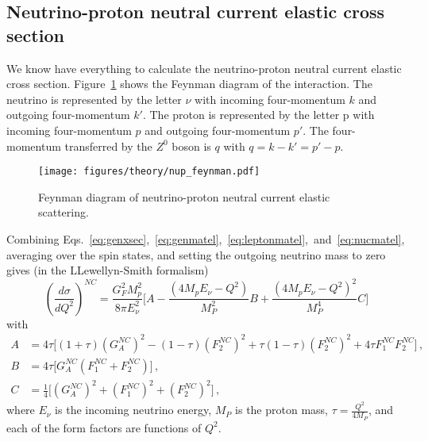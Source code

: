\subsection{Neutrino-proton neutral current elastic cross section}\label{sec:probe}

  We know have everything to calculate the neutrino-proton neutral current
  elastic cross section. Figure~\ref{fig:feynmannup} shows the Feynman diagram
  of the interaction. The neutrino is represented by the letter $\nu$ with
  incoming four-momentum $k$ and outgoing four-momentum $k'$. The proton is
  represented by the letter p with incoming four-momentum $p$ and outgoing
  four-momentum $p'$. The four-momentum transferred by the $Z^0$ boson is $q$
  with $q = k-k' = p' - p$.
  \begin{figure}[ht]
    \centering
    \texttt{[image: figures/theory/nup\_feynman.pdf]}
    \caption{Feynman diagram of neutrino-proton neutral current elastic
    scattering.}
    \label{fig:feynmannup}
  \end{figure}

  Combining
  Eqs.~\ref{eq:genxsec},~\ref{eq:genmatel},~\ref{eq:leptonmatel},~and~\ref{eq:nucmatel},
  averaging over the spin states, and setting the outgoing neutrino mass to
  zero gives (in the LLewellyn-Smith formalism)~\cite{LLewellynSmith:1971uhs}
  \begin{equation}
    (\frac{d\sigma}{dQ^2})^{NC} = \frac{G_F^2 M_p^2}{8\pi E_{\nu}^2} 
      \bigg[A - \frac{(4M_p E_{\nu} - Q^2)}{M_P^2} B + \frac{(4M_p E_{\nu} - Q^2)^2}{M_P^4} C \bigg]
  \end{equation}
  with
  \begin{align*}
    A &= 4\tau\big[(1+\tau)(G_A^{NC})^2 - (1-\tau)(F_2^{NC})^2 + \tau(1 - \tau)(F_2^{NC})^2 + 4\tau F_1^{NC} F_2^{NC}\big] \,, \\
    B &= 4\tau \big[G_A^{NC}(F_1^{NC} + F_2^{NC}) \big] \,, \\
    C &= \frac{1}{4}\big[ (G_A^{NC})^2 + (F_1^{NC})^2 + (F_2^{NC})^2 \big] \,,
  \end{align*}
  where $E_{\nu}$ is the incoming neutrino energy, $M_P$ is the proton mass,
  $\tau = \frac{Q^2}{4M_P}$, and each of the form factors are functions of
  $Q^2$.


